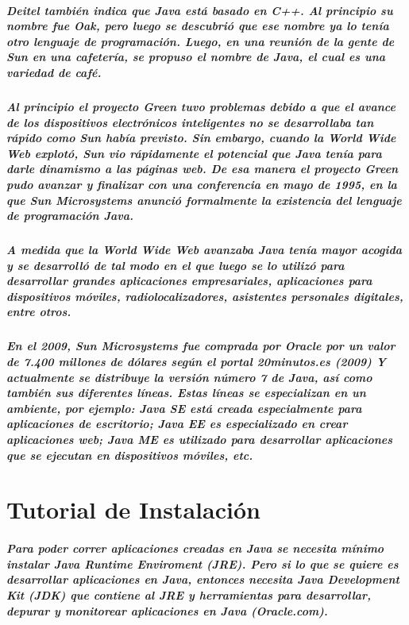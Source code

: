 \documentclass[12pt]{book} %
\begin{document}
\paragraph{Deitel también indica que Java está basado en C++. Al principio su nombre fue Oak, pero luego se descubrió que ese nombre ya lo tenía otro lenguaje de programación. Luego, en una reunión de la gente de Sun en una cafetería, se propuso el nombre de Java, el cual es una variedad de café. }
\paragraph{Al principio el proyecto Green tuvo problemas debido a que el avance de los dispositivos electrónicos inteligentes no se desarrollaba tan rápido como Sun había previsto. Sin embargo, cuando la World Wide Web explotó, Sun vio rápidamente el potencial que Java tenía para darle dinamismo a las páginas web. De esa manera el proyecto Green pudo avanzar y finalizar con una conferencia en mayo de 1995, en la que Sun Microsystems anunció formalmente la existencia del lenguaje de programación Java. }
\paragraph{A medida que la World Wide Web avanzaba Java tenía mayor acogida y se desarrolló de tal modo en el que luego se lo utilizó para desarrollar grandes aplicaciones empresariales, aplicaciones para dispositivos móviles, radiolocalizadores, asistentes personales digitales, entre otros. }
\paragraph{En el 2009, Sun Microsystems fue comprada por Oracle por un valor de 7.400 millones de dólares según el portal 20minutos.es (2009) Y actualmente se distribuye la versión número 7 de Java, así como también sus diferentes líneas. Estas líneas se especializan en un ambiente, por ejemplo: Java SE está creada especialmente para aplicaciones de escritorio; Java EE es especializado en crear aplicaciones web; Java ME es utilizado para desarrollar aplicaciones que se ejecutan en dispositivos móviles, etc. }



\chapter{Tutorial de Instalación}
\paragraph{Para poder correr aplicaciones creadas en Java se necesita mínimo instalar Java Runtime Enviroment (JRE). Pero si lo que se quiere es desarrollar aplicaciones en Java, entonces necesita Java Development Kit (JDK) que contiene al JRE y herramientas para desarrollar, depurar y monitorear aplicaciones en Java (Oracle.com).}
\end{document}

